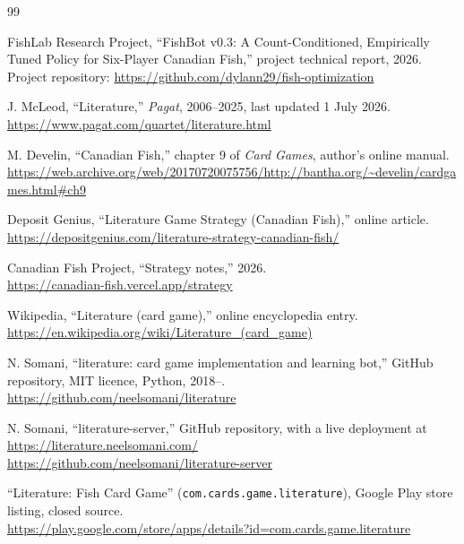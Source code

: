 \begin{thebibliography}{99}


FishLab Research Project, ``FishBot v0.3: A Count-Conditioned, Empirically Tuned
Policy for Six-Player Canadian Fish,'' project technical report, 2026. Project
repository: \url{https://github.com/dylann29/fish-optimization}

J. McLeod, ``Literature,'' \emph{Pagat}, 2006--2025, last updated 1 July 2026.\\
\url{https://www.pagat.com/quartet/literature.html}

M. Develin, ``Canadian Fish,'' chapter 9 of \emph{Card Games}, author's online
manual.\\
\url{https://web.archive.org/web/20170720075756/http://bantha.org/~develin/cardgames.html\#ch9}

Deposit Genius, ``Literature Game Strategy (Canadian Fish),'' online article.\\
\url{https://depositgenius.com/literature-strategy-canadian-fish/}

Canadian Fish Project, ``Strategy notes,'' 2026.\\
\url{https://canadian-fish.vercel.app/strategy}

Wikipedia, ``Literature (card game),'' online encyclopedia entry.\\
\url{https://en.wikipedia.org/wiki/Literature_(card_game)}

N. Somani, ``literature: card game implementation and learning bot,'' GitHub
repository, MIT licence, Python, 2018--.\\
\url{https://github.com/neelsomani/literature}

N. Somani, ``literature-server,'' GitHub repository, with a live deployment at
\url{https://literature.neelsomani.com/}\\
\url{https://github.com/neelsomani/literature-server}

``Literature: Fish Card Game'' (\texttt{com.cards.game.literature}), Google Play
store listing, closed source.\\
\url{https://play.google.com/store/apps/details?id=com.cards.game.literature}


\end{thebibliography}

